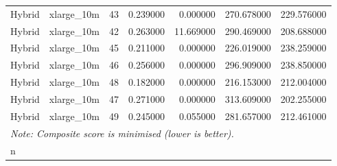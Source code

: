 \begin{tabular}{llrrrrr}
Hybrid & xlarge_10m & 43 & 0.239000 & 0.000000 & 270.678000 & 229.576000 \\
Hybrid & xlarge_10m & 42 & 0.263000 & 11.669000 & 290.469000 & 208.688000 \\
Hybrid & xlarge_10m & 45 & 0.211000 & 0.000000 & 226.019000 & 238.259000 \\
Hybrid & xlarge_10m & 46 & 0.256000 & 0.000000 & 296.909000 & 238.850000 \\
Hybrid & xlarge_10m & 48 & 0.182000 & 0.000000 & 216.153000 & 212.004000 \\
Hybrid & xlarge_10m & 47 & 0.271000 & 0.000000 & 313.609000 & 202.255000 \\
Hybrid & xlarge_10m & 49 & 0.245000 & 0.055000 & 281.657000 & 212.461000 \\
\bottomrule
\multicolumn{6}{l}{\small\textit{Note: Composite score is minimised (lower is better).}}\\n
\end{tabular}
